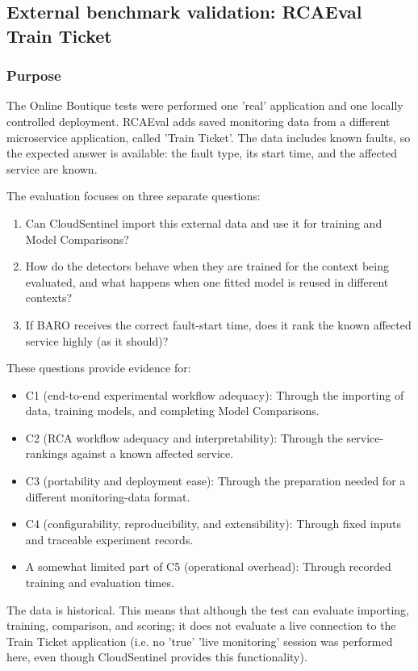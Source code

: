 \subsection{External benchmark validation: RCAEval Train Ticket}

\subsubsection{Purpose}

The Online Boutique tests were performed one 'real' application and one locally controlled deployment. RCAEval adds saved monitoring data from a different microservice application, called 'Train Ticket'. The data includes known faults, so the expected answer is available: the fault type, its start time, and the affected service are known.

The evaluation focuses on three separate questions:
\begin{enumerate}
    \item Can CloudSentinel import this external data and use it for training and Model Comparisons?
    \item How do the detectors behave when they are trained for the context being evaluated, and what happens when one fitted model is reused in different contexts?
    \item If BARO receives the correct fault-start time, does it rank the known affected service highly (as it should)?
\end{enumerate}

These questions provide evidence for:
\begin{itemize}
    \item C1 (end-to-end experimental workflow adequacy): Through the importing of data, training models, and completing Model Comparisons.
    \item C2 (RCA workflow adequacy and interpretability): Through the service-rankings against a known affected service.
    \item C3 (portability and deployment ease): Through the preparation needed for a different monitoring-data format.
    \item C4 (configurability, reproducibility, and extensibility): Through fixed inputs and traceable experiment records.
    \item A somewhat limited part of C5 (operational overhead): Through recorded training and evaluation times.
\end{itemize}
The data is historical. This means that although the test can evaluate importing, training, comparison, and scoring; it does not evaluate a live connection to the Train Ticket application (i.e. no 'true' 'live monitoring' session was performed here, even though CloudSentinel provides this functionality).

